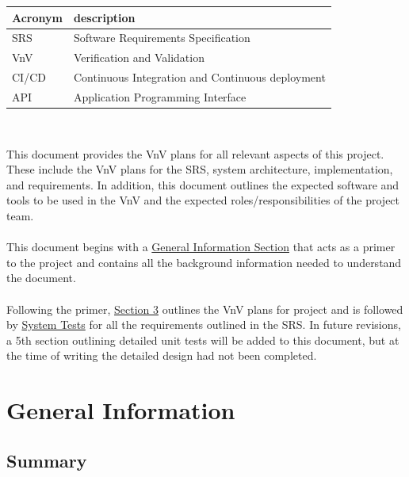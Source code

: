 \documentclass[12pt, titlepage]{article}
\begin{document}
\renewcommand{\arraystretch}{1.2}
\begin{tabular}{l l} 
  \toprule		
  \textbf{Acronym} & \textbf{description}\\
  \midrule 
  SRS & Software Requirements Specification\\
  VnV & Verification and Validation\\
  CI/CD & Continuous Integration and Continuous deployment\\   
  API & Application Programming Interface\\
  \bottomrule
\end{tabular}\\



\newpage


This document provides the VnV plans for all relevant aspects of this project. These include the VnV plans for the SRS, system architecture, implementation, and requirements. In addition, this document outlines the expected software and tools to be used in the VnV and the expected roles/responsibilities of the project team. \\\\This document begins with a 
\hyperref[sec:generalInfo]{General Information Section} that acts as a primer to the project and contains all the background information needed to understand the document.\\\\Following the primer, \hyperref[section:JustPlan]{Section 3} outlines the VnV plans for project and is followed by \hyperref[section:systemTests]{System Tests} for all the requirements outlined in the SRS. In future revisions, a 5th section outlining detailed unit tests will be added to this document, but at the time of writing the detailed design had not been completed.

\section{General Information}
\label{sec:generalInfo}
\subsection{Summary}
\end{document}
